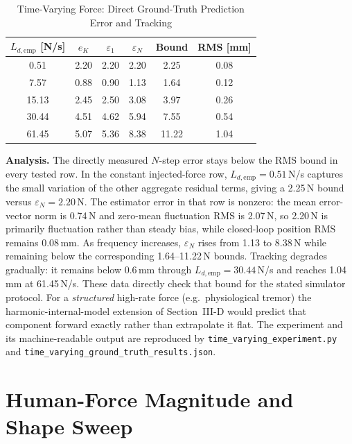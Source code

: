 \documentclass[journal]{IEEEtran}
\begin{document}
\begin{table}[!t]
\caption{Time-Varying Force: Direct Ground-Truth Prediction Error and Tracking}
\label{tab:tv}
\renewcommand{\arraystretch}{1.0}
\footnotesize
\setlength{\tabcolsep}{3pt}
\begin{tabular}{cccccc}
\toprule
$L_{d,\mathrm{emp}}$ [N/s] & $e_K$ & $\varepsilon_1$ & $\varepsilon_N$ & Bound & RMS [mm]\\
\midrule
0.51  & 2.20 & 2.20 & 2.20 & 2.25 & 0.08\\
7.57  & 0.88 & 0.90 & 1.13 & 1.64 & 0.12\\
15.13 & 2.45 & 2.50 & 3.08 & 3.97 & 0.26\\
30.44 & 4.51 & 4.62 & 5.94 & 7.55 & 0.54\\
61.45 & 5.07 & 5.36 & 8.38 & 11.22 & 1.04\\
\bottomrule
\end{tabular}
\end{table}

\textbf{Analysis.} The directly measured $N$-step error stays below the
RMS bound in every tested row. In the constant injected-force row,
$L_{d,\mathrm{emp}}=0.51$\,N/s captures the small variation of the other
aggregate residual terms, giving a 2.25\,N bound versus
$\varepsilon_N=2.20$\,N. The estimator error in that row is nonzero: the
mean error-vector norm is 0.74\,N and zero-mean fluctuation RMS is
2.07\,N, so 2.20\,N is primarily fluctuation rather than steady bias, while
closed-loop position RMS remains 0.08\,mm. As frequency increases, $\varepsilon_N$
rises from 1.13 to 8.38\,N while remaining below the corresponding
1.64--11.22\,N bounds. Tracking degrades gradually: it remains below
0.6\,mm through $L_{d,\mathrm{emp}}=30.44$\,N/s and reaches 1.04\,mm at
61.45\,N/s.
These data directly check that bound for the stated simulator protocol.
For a
\emph{structured} high-rate force (e.g.\ physiological tremor) the
harmonic-internal-model extension of Section~III-D would predict that
component forward exactly rather than extrapolate it flat. The
experiment and its machine-readable output are reproduced by
\texttt{time\_varying\_experiment.py} and
\texttt{time\_varying\_ground\_truth\_results.json}.

\section{Human-Force Magnitude and Shape Sweep}\label{sec:forcesweep}
\end{document}
